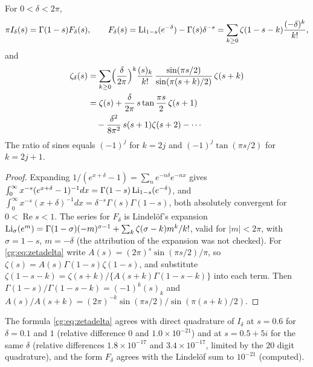 \begin{theorem}\label{cg:thm:expansion}
For $0<\delta<2\pi$,
\begin{equation}\label{cg:eq:Fdelta}
\pi I_\delta(s)=\Gamma(1-s)F_\delta(s),\qquad F_\delta(s)=\operatorname{Li}_{1-s}(e^{-\delta})-\Gamma(s)\delta^{-s}=\sum_{k\ge0}\zeta(1-s-k)\frac{(-\delta)^k}{k!},
\end{equation}
and
\begin{equation}\label{cg:eq:zetadelta}
\begin{split}\zeta_\delta(s)&=\sum_{k\ge0}\Bigl(\frac{\delta}{2\pi}\Bigr)^k\frac{(s)_k}{k!}\,\frac{\sin(\pi s/2)}{\sin(\pi(s+k)/2)}\,\zeta(s+k)\\
&=\zeta(s)+\frac{\delta}{2\pi}\,s\tan\frac{\pi s}{2}\,\zeta(s+1)\\
&\quad-\frac{\delta^2}{8\pi^2}\,s(s+1)\zeta(s+2)-\cdots
\end{split}\end{equation}
The ratio of sines equals $(-1)^j$ for $k=2j$ and $(-1)^j\tan(\pi s/2)$ for $k=2j+1$.
\end{theorem}

\begin{proof}
Expanding $1/(e^{x+\delta}-1)=\sum_ne^{-n\delta}e^{-nx}$ gives $\int_0^\infty x^{-s}(e^{x+\delta}-1)^{-1}dx=\Gamma(1-s)\operatorname{Li}_{1-s}(e^{-\delta})$, and $\int_0^\infty x^{-s}(x+\delta)^{-1}dx=\delta^{-s}\Gamma(s)\Gamma(1-s)$, both absolutely convergent for $0<\operatorname{Re}s<1$. The series for $F_\delta$ is Lindel\"of's expansion $\operatorname{Li}_\sigma(e^{m})=\Gamma(1-\sigma)(-m)^{\sigma-1}+\sum_k\zeta(\sigma-k)m^k/k!$, valid for $|m|<2\pi$, with $\sigma=1-s$, $m=-\delta$ (the attribution of the expansion was not checked). For \eqref{cg:eq:zetadelta} write $A(s)=(2\pi)^s\sin(\pi s/2)/\pi$, so $\zeta(s)=A(s)\Gamma(1-s)\zeta(1-s)$, and substitute $\zeta(1-s-k)=\zeta(s+k)/\{A(s+k)\Gamma(1-s-k)\}$ into each term. Then $\Gamma(1-s)/\Gamma(1-s-k)=(-1)^k(s)_k$ and $A(s)/A(s+k)=(2\pi)^{-k}\sin(\pi s/2)/\sin(\pi(s+k)/2)$.
\end{proof}

The formula \eqref{cg:eq:zetadelta} agrees with direct quadrature of $I_\delta$ at $s=0.6$ for $\delta=0.1$ and $1$ (relative difference $0$ and $1.0\times10^{-21}$) and at $s=0.5+5i$ for the same $\delta$ (relative differences $1.8\times10^{-17}$ and $3.4\times10^{-17}$, limited by the $20$ digit quadrature), and the form $F_\delta$ agrees with the Lindel\"of sum to $10^{-21}$ (computed).


